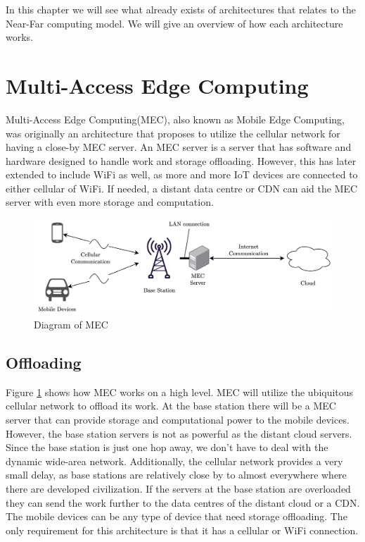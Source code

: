 
In this chapter we will see what already exists of architectures that relates to the Near-Far computing model. We will give an overview of how each architecture works.




\section{Multi-Access Edge Computing}\label{section:MEC_architecture}
Multi-Access Edge Computing(MEC), also known as Mobile Edge Computing, was originally an architecture that proposes to utilize the cellular network for having a close-by MEC server\cite{porambage_survey_2018}. An MEC server is a server that has software and hardware designed to handle work and storage offloading. However, this has later extended to include WiFi as well, as more and more IoT devices are connected to either cellular of WiFi. If needed, a distant data centre or CDN can aid the MEC server with even more storage and computation.
\begin{figure}[t]
    \centering
    \includegraphics[scale=0.75]{chapters/architectures/figures/MEC.png}
    \caption{Diagram of MEC}
    \label{fig:MEC}
\end{figure}

\subsection{Offloading}
Figure \ref{fig:MEC} shows how MEC works on a high level. MEC will utilize the ubiquitous cellular network to offload its work. At the base station there will be a MEC server that can provide storage and computational power to the mobile devices. However, the base station servers is not as powerful as the distant cloud servers. Since the base station is just one hop away, we don't have to deal with the dynamic wide-area network. Additionally, the cellular network provides a very small delay, as base stations are relatively close by to almost everywhere where there are developed civilization. If the servers at the base station are overloaded they can send the work further to the data centres of the distant cloud or a CDN. The mobile devices can be any type of device that need storage offloading. The only requirement for this architecture is that it has a cellular or WiFi connection.

